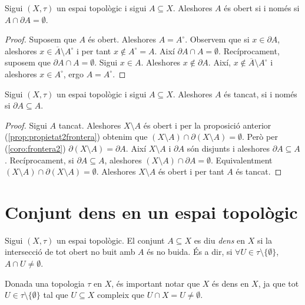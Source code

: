 \documentclass[../main.tex]{subfiles}
\begin{document}
\begin{prop}
\label{prop:propietat2frontera} Sigui $(X,\tau)$ un espai topològic i sigui $A\subseteq X$. Aleshores $A$ és obert si i només si $A\cap \partial A=\emptyset$.
\end{prop}
\begin{proof}
Suposem que $A$ és obert. Aleshores $A = A^\circ$. Observem que si $x\in\partial A$, aleshores $x\in \overline{A}\setminus A^\circ$ i per tant $x\not\in A^\circ = A$. Així $\partial A\cap A=\emptyset$. Recíprocament, suposem que $\partial A\cap A =\emptyset$. Sigui $x\in A$. Aleshores $x\not\in\partial A$. Així, $x\not\in \overline{A}\setminus A^\circ$ i aleshores $x\in A^\circ$, ergo $A = A^\circ$.
\end{proof}

\begin{prop}
\label{prop:propietat3frontera} Sigui $(X,\tau)$ un espai topològic i sigui $A\subseteq X$. Aleshores $A$ és tancat, si i només si $\partial A\subseteq A$.
\end{prop}
\begin{proof}
Sigui $A$ tancat. Aleshores $X\setminus A$ és obert i per la proposició anterior (\ref{prop:propietat2frontera}) obtenim que $(X\setminus A)\cap \partial (X\setminus A) = \emptyset$. Però per (\ref{coro:frontera2}) $\partial (X\setminus A) = \partial A$. Així $X\setminus A$ i $\partial A$ són disjunts i aleshores $\partial A\subseteq A$. Recíprocament, si $\partial A\subseteq A$, aleshores $(X\setminus A)\cap \partial A = \emptyset$. Equivalentment $(X\setminus A)\cap \partial (X\setminus A)=\emptyset$. Aleshores $X\setminus A$ és obert i per tant $A$ és tancat.
\end{proof}




\section{Conjunt dens en un espai topològic}
\begin{defi}
[Dens]\label{def:dens} Sigui $(X,\tau)$ un espai topològic. El conjunt $A\subseteq X$ es diu \textit{dens} en $X$ si la intersecció de tot obert no buit amb $A$ és no buida. És a dir, si $\forall U\in\tau\setminus\{\emptyset\}$, $A\cap U\not=\emptyset$.
\end{defi}

Donada una topologia $\tau$ en $X$, és important notar que $X$ és dens en $X$, ja que tot $U\in\tau\setminus\{\emptyset\}$ tal que $U\subseteq X$ compleix que $U\cap X = U\not=\emptyset$.
\end{document}

